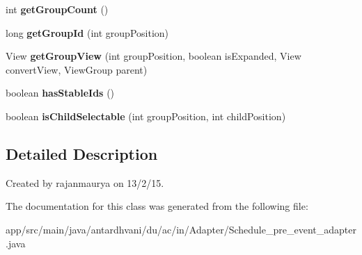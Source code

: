 \begin{DoxyCompactItemize}
\item 
\hypertarget{classantardhvani_1_1du_1_1ac_1_1in_1_1_adapter_1_1_schedule__pre__event__adapter_a79e9d5358c233fb7f00a642642efaab4}{}int {\bfseries get\+Group\+Count} ()\label{classantardhvani_1_1du_1_1ac_1_1in_1_1_adapter_1_1_schedule__pre__event__adapter_a79e9d5358c233fb7f00a642642efaab4}

\item 
\hypertarget{classantardhvani_1_1du_1_1ac_1_1in_1_1_adapter_1_1_schedule__pre__event__adapter_a0d88234b7bf05888f3b59e03a2d107a1}{}long {\bfseries get\+Group\+Id} (int group\+Position)\label{classantardhvani_1_1du_1_1ac_1_1in_1_1_adapter_1_1_schedule__pre__event__adapter_a0d88234b7bf05888f3b59e03a2d107a1}

\item 
\hypertarget{classantardhvani_1_1du_1_1ac_1_1in_1_1_adapter_1_1_schedule__pre__event__adapter_aa18483246d554c5facc16644dcc2b2b0}{}View {\bfseries get\+Group\+View} (int group\+Position, boolean is\+Expanded, View convert\+View, View\+Group parent)\label{classantardhvani_1_1du_1_1ac_1_1in_1_1_adapter_1_1_schedule__pre__event__adapter_aa18483246d554c5facc16644dcc2b2b0}

\item 
\hypertarget{classantardhvani_1_1du_1_1ac_1_1in_1_1_adapter_1_1_schedule__pre__event__adapter_af28ca7ace4745f294444407bf9352a6b}{}boolean {\bfseries has\+Stable\+Ids} ()\label{classantardhvani_1_1du_1_1ac_1_1in_1_1_adapter_1_1_schedule__pre__event__adapter_af28ca7ace4745f294444407bf9352a6b}

\item 
\hypertarget{classantardhvani_1_1du_1_1ac_1_1in_1_1_adapter_1_1_schedule__pre__event__adapter_af2d63c02519eff43152139f014e078c8}{}boolean {\bfseries is\+Child\+Selectable} (int group\+Position, int child\+Position)\label{classantardhvani_1_1du_1_1ac_1_1in_1_1_adapter_1_1_schedule__pre__event__adapter_af2d63c02519eff43152139f014e078c8}

\end{DoxyCompactItemize}


\subsection{Detailed Description}
Created by rajanmaurya on 13/2/15. 

The documentation for this class was generated from the following file\+:\begin{DoxyCompactItemize}
\item 
app/src/main/java/antardhvani/du/ac/in/\+Adapter/Schedule\+\_\+pre\+\_\+event\+\_\+adapter.\+java\end{DoxyCompactItemize}
